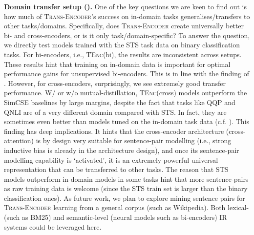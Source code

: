 \documentclass{article} \usepackage{iclr2021_conference,times}
\newcommand{\modelname}{\textsc{Trans-Encoder}\xspace}
\newcommand{\tenc}{\textsc{TEnc}\xspace}
\begin{document}
\textbf{Domain transfer setup ().} One of the key questions we are keen to find out is how much of \modelname's success on in-domain tasks generalises/transfers to other tasks/domains. 
Specifically, does \modelname create universally better bi- and cross-encoders, or is it only task/domain-specific?
To answer the question, we directly test models trained with the STS task data on binary classification tasks. 
For bi-encoders, i.e., \tenc (bi), the results are inconsistent across setups. These results hint that training on in-domain data is important for optimal performance gains for unsupervised bi-encoders. This is in line with the finding of \citep{liu2021fast}.
However, for cross-encoders, surprisingly, we see extremely good transfer performance. W/ or w/o mutual-distillation, \tenc (cross) models outperform the SimCSE baselines by large margins, despite the fact that tasks like QQP and QNLI are of a very different domain compared with STS. In fact, they are sometimes even better than models tuned on the in-domain task data (c.f. ). This finding has deep implications. It hints that the cross-encoder architecture (cross-attention) is by design very suitable for sentence-pair modelling (i.e., strong inductive bias is already in the architecture design), and once its sentence-pair modelling capability is `activated', it is an extremely powerful  universal representation that can be transferred to other tasks.
The reason that STS models outperform in-domain models in some tasks hint that more sentence-pairs as raw training data is welcome (since the STS train set is larger than the binary classification ones). As future work, we plan to explore mining sentence pairs for \modelname learning from a general corpus (such as Wikipedia). Both lexical- (such as BM25) and semantic-level (neural models such as bi-encoders) IR systems could be leveraged here.
\end{document}
